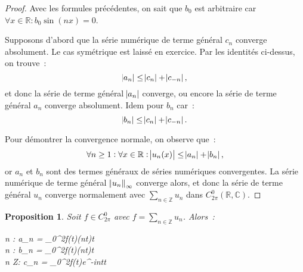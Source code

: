 \documentclass{report}
\newtheorem{prp}[thm]{Proposition}
\theoremstyle{definition}
\theoremstyle{remark}
\numberwithin{equation}{section}
\newcommand{\C}{\mathbb C}
\newcommand{\R}{\mathbb R}
\newcommand{\Z}{\mathbb Z}
\begin{document}
			\begin{proof} Avec les formules précédentes, on sait que $b_0$ est arbitraire car $\forall x \in \R : b_0\sin(nx) = 0$.

			Supposons d'abord que la série numérique de terme général $c_n$ converge absolument. Le cas symétrique est laissé en exercice. Par les identités
			ci-dessus, on trouve~:
			\begin{equation}
				\abs {a_n} \leq \abs {c_n} + \abs {c_{-n}},
			\end{equation}
			et donc la série de terme général $\abs {a_n}$ converge, ou encore la série de terme général $a_n$ converge absolument. Idem pour $b_n$ car~:
			\begin{equation}
				\abs {b_n} \leq \abs {c_n} + \abs {c_{-n}}.
			\end{equation}

			Pour démontrer la convergence normale, on observe que~:
			\begin{equation}
				\forall n \geq 1 : \forall x \in \R : \abs {u_n(x)} \leq \abs {a_n} + \abs {b_n},
			\end{equation}
			or $a_n$ et $b_n$ sont des termes généraux de séries numériques convergentes. La série numérique de terme général $\norm {u_n}_\infty$ converge alors, et
			donc la série de terme général $u_n$ converge normalement avec $\sum_{n \in \Z}u_n$ dans $C^0_{2\pi}(\R, \C)$.
			\end{proof}

			\begin{prp} Soit $f \in C^0_{2\pi}$ avec $f = \sum_{n \in \Z}u_n$. Alors~:
			\begin{subnumcases}{}
				\forall n  : a_n = \pi \int_0^{2\pi}f(t)\cos(nt)\dif t \\
				\forall n  : b_n = \pi \int_0^{2\pi}f(t)\sin(nt)\dif t \\
				\forall n \in \Z : c_n = \int_0^{2\pi}f(t)e^{-int}\dif t\label{eq:Fourier c_n}
			\end{subnumcases}
			\end{prp}
\end{document}
